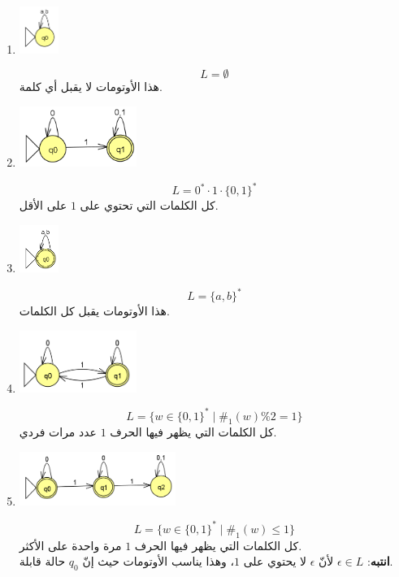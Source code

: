 ﻿\documentclass[12pt]{article}
\begin{document}
\begin{enumerate}[itemsep=3em]
\begin{enumerate}
\item
\includegraphics[width=0.1\textwidth]{../../../images/DFAs/ex1_q8.png}\\
\ifwithsols
\begin{boxSolution}
\[ L = \emptyset \]
هذا الأوتومات لا يقبل أي كلمة.
\end{boxSolution}
\fi

\item
\includegraphics[width=0.3\textwidth]{../../../images/DFAs/ex1_q9.png}\\
\ifwithsols
\begin{boxSolution}
\[ L = 0^* \cdot 1 \cdot \{0, 1\}^* \]
كل الكلمات التي تحتوي على $1$ على الأقل.
\end{boxSolution}
\fi

\item
\includegraphics[width=0.1\textwidth]{../../../images/DFAs/ex1_q10.png}
\ifwithsols
\begin{boxSolution}
\[ L = \{a, b\}^* \]
هذا الأوتومات يقبل كل الكلمات.
\end{boxSolution}
\fi

\item
\includegraphics[width=0.3\textwidth]{../../../images/DFAs/ex1_q11.png}
\ifwithsols
\begin{boxSolution}
\[ L = \{ w \in \{0, 1\}^* \mid \#_1(w) \% 2 = 1 \} \]
كل الكلمات التي يظهر فيها الحرف $1$ عدد مرات فردي.
\end{boxSolution}
\fi

\item
\includegraphics[width=0.4\textwidth]{../../../images/DFAs/ex1_q12.png}
\ifwithsols
\begin{boxSolution}
\[ L = \{ w \in \{0, 1\}^* \mid \#_1(w) \leq 1 \} \]
كل الكلمات التي يظهر فيها الحرف $1$ مرة واحدة على الأكثر. \\
\textbf{انتبه}: $\epsilon \in L$ لأنّ $\epsilon$ لا يحتوي على $1$، وهذا يناسب الأوتومات حيث إنّ $q_0$ حالة قابلة.
\end{boxSolution}
\fi


\end{enumerate}
\end{enumerate}
\end{document}
